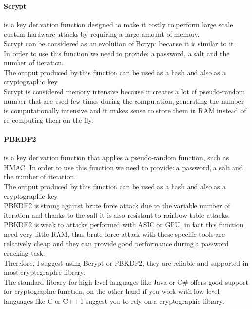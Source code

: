 \paragraph{Scrypt} is a key derivation function designed to make it costly to perform large scale custom hardware attacks by requiring a large amount of memory.\\
Scrypt can be considered as an evolution of Bcrypt because it is similar to it.\\
In order to use this function we need to provide: a password, a salt and the number of iteration.\\
The output produced by this function can be used as a hash and also as a cryptographic key.\\
Scrypt is considered memory intensive because it creates a lot of pseudo-random number that are used few times during the computation, generating the number is computationally intensive and it makes sense to store them in RAM instead of re-computing them on the fly\cite{scrypt}.\\


\paragraph{PBKDF2} is a key derivation function that applies a pseudo-random function, such as HMAC.
In order to use this function we need to provide: a password, a salt and the number of iteration.\\
The output produced by this function can be used as a hash and also as a cryptographic key.\\
PBKDF2 is strong against brute force attack due to the variable number of iteration and thanks to the salt it is also resistant to rainbow table attacks.\\
PBKDF2 is weak to attacks performed with ASIC or GPU, in fact this function need very little RAM, thus brute force attack with these specific tools are relatively cheap and they can provide good performance during a password cracking task\cite{pbkdf2}.\\

Therefore, I suggest using Bcrypt or PBKDF2, they are reliable and supported in most cryptographic library.\\
The standard library for high level languages like Java or C\# offers good support for cryptographic function, on the other hand if you work with low level languages like C or C++ I suggest you to rely on a cryptographic library.\\


